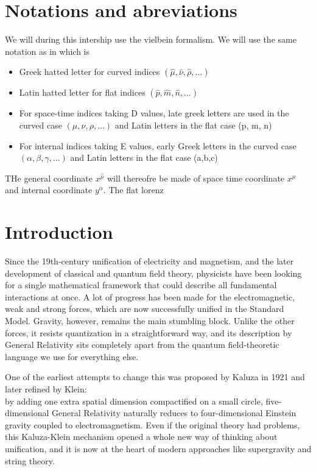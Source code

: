 \documentclass{article}
\begin{document}
\section*{Notations and abreviations}

We will during this intership use the vielbein formalism. We will use the same notation as in \cite{scherk1979get}
which is
\begin{itemize} \label{notation}
    \item Greek hatted letter for curved indices $(\hat \mu , \hat \nu , \hat \rho , \dots)$
    \item Latin hatted letter for flat indices $(\hat p , \hat m , \hat n , \dots)$
    \item For space-time indices taking D values, late greek letters are used in the curved case $(\mu, \nu ,\rho , \dots)$ and Latin letters in the flat case (p, m, n)
    \item For internal indices  taking E values, early Greek  letters in the curved case $(\alpha, \beta ,\gamma , \dots)$ and Latin letters in the flat case (a,b,c)
\end{itemize}
THe general coordinate $x^{ \hat\mu}$ will thereofre be made of space time coordinate $x^ \mu$ and internal coordinate $y^\alpha$. The flat lorenz
\newpage

\tableofcontents
\clearpage
\section{Introduction}
Since the 19th-century unification of electricity and magnetism, 
and the later development of classical and quantum field theory, 
physicists have been looking for a single mathematical framework that could describe all fundamental interactions at once. 
A lot of progress has been made for the electromagnetic, 
weak and strong forces, which are now successfully unified in the Standard Model. Gravity, however, 
remains the main stumbling block. Unlike the other forces, it resists quantization in a straightforward way, 
and its description by General Relativity \cite{einstein1915allgemeinen} 
sits completely apart from the quantum field-theoretic language we use for everything else.

One of the earliest attempts to change this was proposed by Kaluza in 1921 
\cite{kaluza1921unitatsproblem} and later refined by Klein:\\ 
by adding one extra spatial dimension compactified on a small circle, 
five-dimensional General Relativity naturally reduces to four-dimensional Einstein gravity coupled to electromagnetism. 
Even if the original theory had problems, this Kaluza-Klein mechanism opened a whole new way of thinking about unification, 
and it is now at the heart of modern approaches like supergravity \cite{freedman2012supergravity} and string theory.
\end{document}
